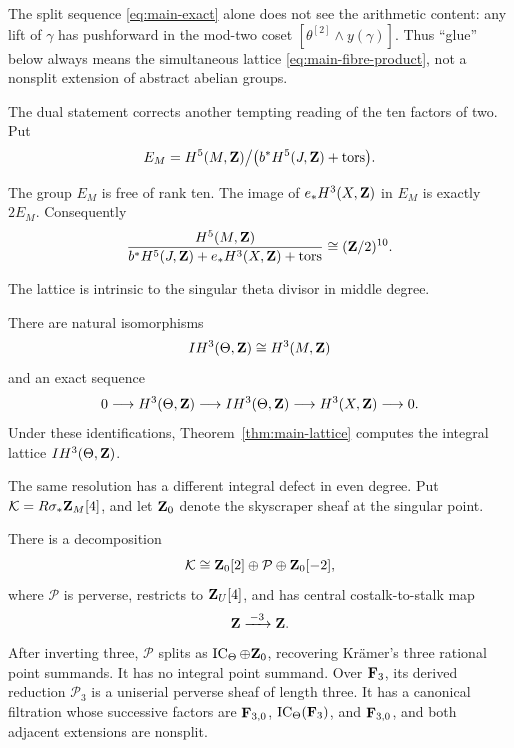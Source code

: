 The split sequence \eqref{eq:main-exact} alone does not see the arithmetic
content: any lift of \(\gamma\) has pushforward in the mod-two coset
\([\theta^{[2]}\wedge y(\gamma)]\).  Thus ``glue'' below always means the
simultaneous lattice \eqref{eq:main-fibre-product}, not a nonsplit extension
of abstract abelian groups.

The dual statement corrects another tempting reading of the ten factors of
two.  Put
\begin{equation}\label{eq:escape-definition}
 E_M=H^5(M,\mathbf Z)\big/
 \bigl(b^*H^5(J,\mathbf Z)+\operatorname{tors}\bigr).
\end{equation}

\begin{theorem}\label{thm:main-escape}
The group \(E_M\) is free of rank ten.  The image of
\(e_*H^3(X,\mathbf Z)\) in \(E_M\) is exactly \(2E_M\).  Consequently
\[
 \frac{H^5(M,\mathbf Z)}{b^*H^5(J,\mathbf Z)+e_*H^3(X,\mathbf Z)+\operatorname{tors}}
 \cong(\mathbf Z/2)^{10}.
\]
\end{theorem}

The lattice is intrinsic to the singular theta divisor in middle degree.

\begin{corollary}\label{cor:main-ih}
There are natural isomorphisms
\[
 IH^3(\Theta,\mathbf Z)\cong H^3(M,\mathbf Z)
\]
and an exact sequence
\[
 0\longrightarrow H^3(\Theta,\mathbf Z)
 \longrightarrow IH^3(\Theta,\mathbf Z)
 \longrightarrow H^3(X,\mathbf Z)\longrightarrow0.
\]
Under these identifications, Theorem~\ref{thm:main-lattice} computes the
integral lattice \(IH^3(\Theta,\mathbf Z)\).
\end{corollary}

The same resolution has a different integral defect in even degree.  Put
\(\mathcal K=R\sigma_*\mathbf Z_M[4]\), and let \(\mathbf Z_0\) denote the skyscraper
sheaf at the singular point.

\begin{theorem}\label{thm:integral-decomposition}
There is a decomposition
\[
 \mathcal K\cong\mathbf Z_0[2]\oplus\mathcal P\oplus\mathbf Z_0[-2],
\]
where \(\mathcal P\) is perverse, restricts to \(\mathbf Z_U[4]\), and has central
costalk-to-stalk map
\[
 \mathbf Z\xrightarrow{\,-3\,}\mathbf Z.
\]
After inverting three, \(\mathcal P\) splits as
\(\operatorname{IC}_\Theta\oplus\mathbf Z_0\), recovering Kr\"amer's three rational point
summands.  It has no integral point summand.  Over \(\mathbf F_3\), its derived
reduction \(\mathcal P_3\) is a uniserial perverse sheaf of length three.  It
has a canonical filtration whose successive factors are
\(\mathbf F_{3,0}\), \(\operatorname{IC}_\Theta(\mathbf F_3)\), and \(\mathbf F_{3,0}\), and both adjacent
extensions are nonsplit.
\end{theorem}

